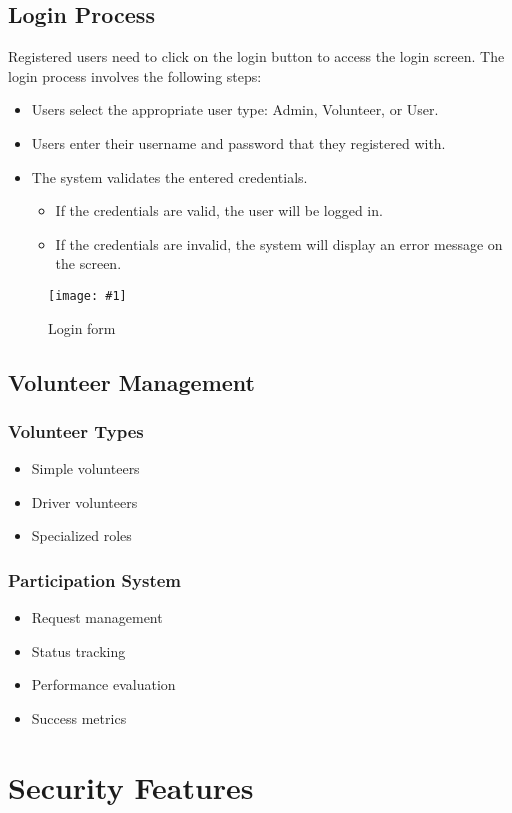 \documentclass[a4paper, 12pt]{article}
\newcommand{\includeimage}[2]{
    \begin{figure}[H]
        \centering
        \texttt{[image: \#1]}
        \if\relax\detokenize{#2}\relax
        \else
            \caption{#2}
        \fi
    \end{figure}
}
\begin{document}
\subsection*{Login Process}
Registered users need to click on the login button to access the login screen. The login process involves the following steps:
\begin{itemize}
    \item Users select the appropriate user type: Admin, Volunteer, or User.
    \item Users enter their username and password that they registered with.
    \item The system validates the entered credentials.
    \begin{itemize}
        \item If the credentials are valid, the user will be logged in.
        \item If the credentials are invalid, the system will display an error message on the screen.
    \end{itemize}
\end{itemize}
\includeimage{images/image_13.png}{Login form}
\subsection*{Volunteer Management}

\subsubsection*{Volunteer Types}
\begin{itemize}
    \item Simple volunteers
    \item Driver volunteers
    \item Specialized roles
\end{itemize}

\subsubsection*{Participation System}
\begin{itemize}
    \item Request management
    \item Status tracking
    \item Performance evaluation
    \item Success metrics
\end{itemize}

\section*{Security Features}
\end{document}
